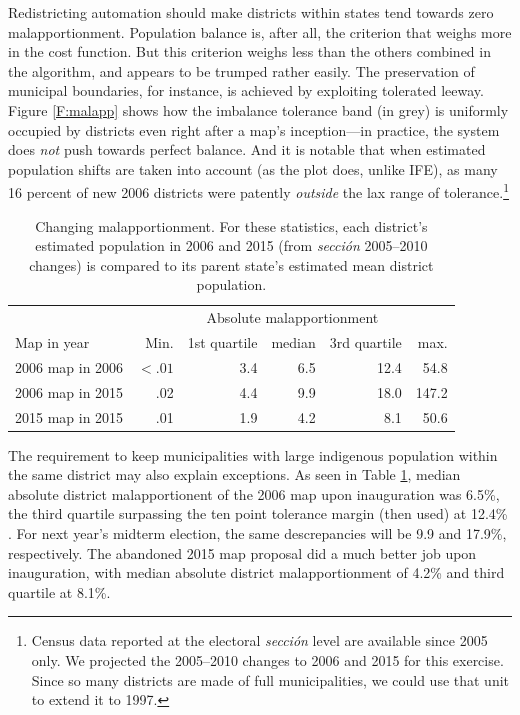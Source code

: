 \documentclass[letter,12pt]{article}
\newcommand{\mc}{\multicolumn}
\begin{document}
Redistricting automation should make districts within states tend towards zero malapportionment. Population balance is, after all, the criterion that weighs more in the cost function. But this criterion weighs less than the others combined in the algorithm, and appears to be trumped rather easily. The preservation of municipal boundaries, for instance, is achieved by exploiting tolerated leeway. Figure \ref{F:malapp} shows how the imbalance tolerance band (in grey) is uniformly occupied by districts even right after a map's inception---in practice, the system does \emph{not} push towards perfect balance. And it is notable that when estimated population shifts are taken into account (as the plot does, unlike IFE), as many 16 percent of new 2006 districts were patently \emph{outside} the lax range of tolerance.\footnote{Census data reported at the electoral \emph{secci\'on} level are available since 2005 only. We projected the 2005--2010 changes to 2006 and 2015 for this exercise. Since so many districts are made of full municipalities, we could use that unit to extend it to 1997.} 


\begin{table}
\begin{center}
  \begin{tabular}{lrrrrr}
                 & \mc{5}{c}{Absolute malapportionment} \\
Map in year      & Min. & 1st quartile & median & 3rd quartile & max. \\ \hline
2006 map in 2006 & $<.01$ & 3.4 & 6.5 & 12.4 & 54.8 \\
2006 map in 2015 & .02 & 4.4 & 9.9 & 18.0 & 147.2 \\
2015 map in 2015 & .01 & 1.9 & 4.2 & 8.1 & 50.6 \\
  \end{tabular}
\caption{Changing malapportionment. For these statistics, each district's estimated population in 2006 and 2015 (from \emph{sección} 2005--2010 changes) is compared to its parent state's estimated mean district population.}\label{T:malap06inTime}
\end{center}
\end{table}

The requirement to keep municipalities with large indigenous population within the same district may also explain exceptions. As seen in Table \ref{T:malap06inTime}, median absolute district malapportionent of the 2006 map upon inauguration was 6.5\%, the third quartile surpassing the ten point tolerance margin (then used) at 12.4\% \citep[also,][]{trelles.mtz.tesisItam.2007}. For next year's midterm election, the same descrepancies will be 9.9 and 17.9\%, respectively. The abandoned 2015 map proposal did a much better job upon inauguration, with median absolute district malapportionment of 4.2\% and third quartile at 8.1\%. 
\end{document}
